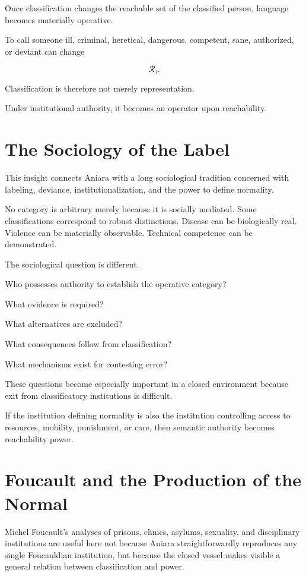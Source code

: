 \documentclass[11pt,oneside]{book}
\theoremstyle{definition}
\theoremstyle{remark}
\newcommand{\R}{\mathcal{R}}
\begin{document}
Once classification changes the reachable set of the classified person, language becomes materially operative.

To call someone ill, criminal, heretical, dangerous, competent, sane, authorized, or deviant can change

\[
\R_i.
\]

Classification is therefore not merely representation.

Under institutional authority, it becomes an operator upon reachability.

\section{The Sociology of the Label}

This insight connects Aniara with a long sociological tradition concerned with labeling, deviance, institutionalization, and the power to define normality.

No category is arbitrary merely because it is socially mediated. Some classifications correspond to robust distinctions. Disease can be biologically real. Violence can be materially observable. Technical competence can be demonstrated.

The sociological question is different.

Who possesses authority to establish the operative category?

What evidence is required?

What alternatives are excluded?

What consequences follow from classification?

What mechanisms exist for contesting error?

These questions become especially important in a closed environment because exit from classificatory institutions is difficult.

If the institution defining normality is also the institution controlling access to resources, mobility, punishment, or care, then semantic authority becomes reachability power.

\section{Foucault and the Production of the Normal}

Michel Foucault's analyses of prisons, clinics, asylums, sexuality, and disciplinary institutions are useful here not because Aniara straightforwardly reproduces any single Foucauldian institution, but because the closed vessel makes visible a general relation between classification and power.
\end{document}
